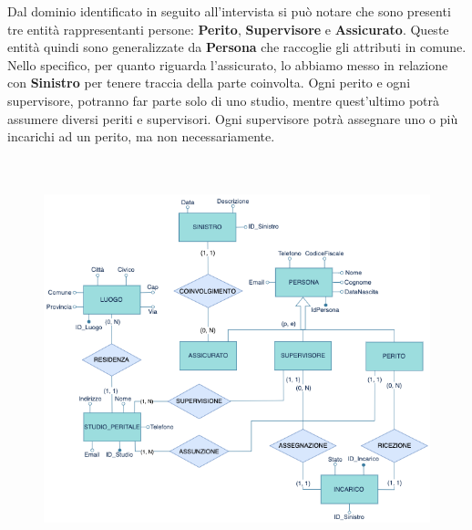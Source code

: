 \documentclass[a4paper,12pt]{report}
\begin{document}
Dal dominio identificato in seguito all’intervista si può notare che sono presenti tre entità rappresentanti persone: \textbf{Perito}, \textbf{Supervisore} e \textbf{Assicurato}. Queste entità quindi sono generalizzate da \textbf{Persona} che raccoglie gli attributi in comune.
Nello specifico, per quanto riguarda l’assicurato, lo abbiamo messo in relazione con \textbf{Sinistro} per tenere traccia della parte coinvolta.
Ogni perito e ogni supervisore, potranno far parte solo di uno studio, mentre quest'ultimo potrà assumere diversi periti e supervisori.
Ogni supervisore potrà assegnare uno o più incarichi ad un perito, ma non necessariamente.
\\
\\
\\
\begin{figure}[ht]
    \begin{center}
        \centering
        \includegraphics[width=\textwidth]{img/StudioPeritale.png}
    \end{center}
\end{figure}
\clearpage
\end{document}
